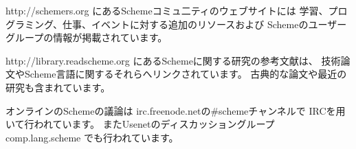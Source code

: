 

{\cf http://schemers.org}
にあるSchemeコミュ二ティのウェブサイトには
学習、プログラミング、仕事、イベントに対する追加のリソースおよび
Schemeのユーザーグループの情報が掲載されています。

{\cf http://library.readscheme.org}
にあるSchemeに関する研究の参考文献は、
技術論文やScheme言語に関するそれらへリンクされています。
古典的な論文や最近の研究も含まれています。

オンラインのSchemeの議論は
{\cf irc.freenode.net}の{\cf \#scheme}チャンネルで
IRCを用いて行われています。
またUsenetのディスカッショングループ {\cf comp.lang.scheme}
でも行われています。
